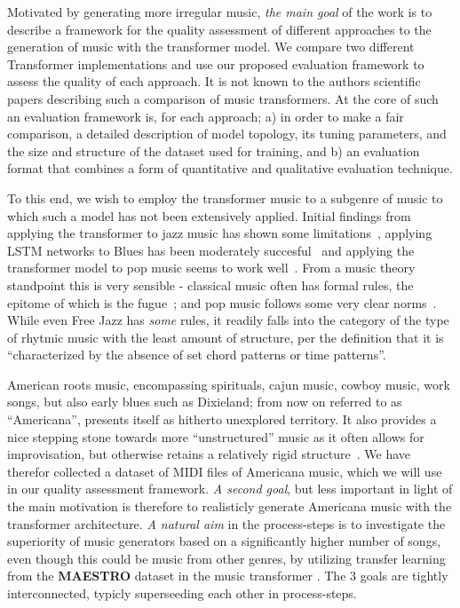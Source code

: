 \documentclass{IEEEtran}
\begin{document}
        Motivated by generating more irregular music, \emph{the main goal} of the work is
        to describe a framework for the quality assessment of different approaches to the generation 
        of music with the transformer model. We compare two different Transformer implementations and use our proposed evaluation framework to assess 
        the quality of each approach. It is not known to the authors scientific papers
        describing such a comparison of music transformers.
        At the core of such an evaluation framework is, for each approach; a) in order to make a fair comparison,
        a detailed description of model topology, its tuning parameters, and the size
        and structure of the dataset used for training, and b) an evaluation format
        that combines a form of quantitative and qualitative evaluation technique.
       
        To this end, we wish to employ the transformer music to a subgenre of music   
        to which such a model has not been extensively applied.
        Initial findings from applying the transformer to jazz music has shown 
        some limitations~\cite{wu2020jazz}, applying LSTM networks to Blues has 
        been moderately succesful~\cite{eck2002bluesLSTM} and applying the transformer 
        model to pop music seems to work well~\cite{huang2020pop}.
        From a music theory standpoint this is very sensible - classical music often has 
        formal rules, the epitome of which is the fugue~\cite{giraud2015computational};
        and pop music follows some very clear norms~\cite{hennion1983production}. While 
        even Free Jazz has \emph{some} rules, it readily falls into the category of the 
        type of rhytmic music with the least amount of structure, per the definition
        that it is ``characterized by the absence of set chord patterns or
        time patterns''\cite{FreeJazz}. 

        American roots music, encompassing spirituals, cajun music, cowboy music, work songs,
        but also early blues such as Dixieland; from now on referred to as ``Americana'', presents 
        itself as hitherto unexplored territory. It also provides a nice stepping stone
        towards more ``unstructured'' music as it often allows for improvisation, but 
        otherwise retains a relatively rigid structure~\cite{libcong}.
        We have therefor collected a dataset of MIDI files of Americana music, which we
        will use in our quality assessment framework. \emph{A second goal}, but less important in light of the main motivation is therefore to realisticly generate Americana music with the transformer architecture. \emph{A natural aim} in the process-steps is to investigate the superiority of music generators based on a significantly higher number of songs, even though this could be music from other genres, by utilizing transfer learning from the \textbf{MAESTRO} dataset in the music transformer \cite{huang2018music}. The 3 goals are tightly interconnected, typicly superseeding each other in process-steps.
\end{document}
